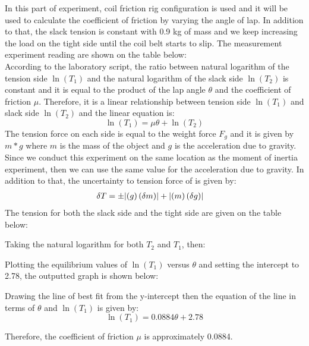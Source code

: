 In this part of experiment, coil friction rig configuration is used and it will be used to calculate the coefficient of friction by varying the angle of lap. In addition to that, the slack tension is constant with 0.9 kg of mass and we keep increasing the load on the tight side until the coil belt starts to slip. The measurement experiment reading are shown on the table below:\\


According to the laboratory script, the ratio between natural logarithm of the tension side $\ln(T_1)$ and the natural logarithm of the slack side $\ln(T_2)$ is constant and it is equal to the product of the lap angle $\theta$ and the coefficient of friction $\mu$. Therefore, it is a linear relationship between tension side $\ln(T_1)$ and  slack side $\ln(T_2)$ and the linear equation is:
\begin{equation}
\ln(T_1) = \mu\theta + \ln(T_2)
\end{equation}
The tension force on each side is equal to the weight force $F_g$ and it is given by $m*g$ where $m$ is the mass of the object and $g$ is the acceleration due to gravity. Since we conduct this experiment on the same location as the moment of inertia experiment, then we can use the same value for the acceleration due to gravity. In addition to that, the uncertainty to tension force of is given by:
\begin{align}
\delta T&=\pm \abs{\left(g\right)(\delta m)} + \abs{\left(m\right)(\delta g)} \notag
\end{align}
The tension for both the slack side and the tight side are given on the table below:


Taking the natural logarithm for both $T_2$ and $T_1$, then:


Plotting the equilibrium values of $\ln(T_1)$ versus $\theta$ and setting the intercept to 2.78, the outputted graph is shown below:
 
Drawing the line of best fit from the y-intercept then the equation of the line in terms of $\theta$ and $\ln(T_1)$ is given by:
\begin{equation}
\ln(T_1) = 0.0884\theta + 2.78 
\end{equation}

Therefore, the coefficient of friction $\mu$ is approximately 0.0884.

